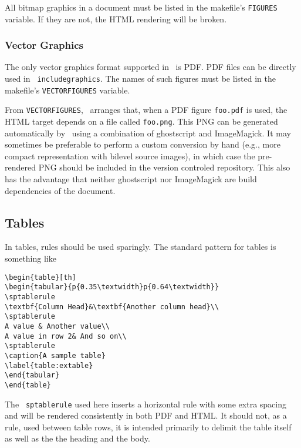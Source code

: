 \documentclass[11pt,a4paper]{ivoa}
\newcommand{\texword}[1]{\texttt{\color{texcolor} #1}}
\begin{document}
All bitmap graphics in a document must  be listed in the makefile's
\texttt{FIGURES} variable.  If they are not, the HTML rendering will be
broken.

\subsubsection{Vector Graphics}
\label{sect:vectorgraphics}

The only vector graphics format supported in \ivoatex\ is PDF.  PDF
files can be directly used in \texword{includegraphics}.  The names of
such figures must be listed in the makefile's \texttt{VECTORFIGURES}
variable.

From \texttt{VECTORFIGURES}, \ivoatex\ arranges that, when a PDF figure 
\texttt{foo.pdf} is used, the HTML target depends on a file called
\texttt{foo.png}.  This PNG can be generated automatically by
\ivoatex\ using a combination of ghostscript and ImageMagick.  It may
sometimes be preferable to perform a custom conversion by hand (e.g.,
more compact representation with bilevel source images), in which case
the pre-rendered PNG should be included in the version controled
repository.  This also
has the advantage that neither ghostscript nor ImageMagick are build
dependencies of the document.

\subsection{Tables}

In tables, rules should be used sparingly.  The standard pattern for tables is
something like
\begin{lstlisting}
\begin{table}[th]
\begin{tabular}{p{0.35\textwidth}p{0.64\textwidth}}
\sptablerule
\textbf{Column Head}&\textbf{Another column head}\\
\sptablerule
A value & Another value\\
A value in row 2& And so on\\
\sptablerule
\caption{A sample table}
\label{table:extable}
\end{tabular}
\end{table}
\end{lstlisting}

The \texword{sptablerule} used here inserts a horizontal rule with some
extra spacing and will be rendered consistently in both PDF and HTML.
It should not, as a rule, used between table rows, it is intended
primarily to delimit the table itself as well as the the heading and the
body.
\end{document}
